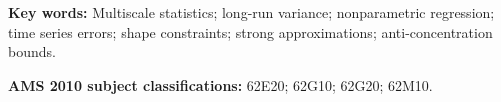 \documentclass[a4paper,12pt]{article}
\begin{document}
\renewcommand{\baselinestretch}{1.2}\normalsize

\textbf{Key words:} Multiscale statistics; long-run variance; nonparametric regression; time series errors; shape constraints; strong approximations; anti-concentration bounds.

\textbf{AMS 2010 subject classifications:} 62E20; 62G10; 62G20; 62M10. 

\allowdisplaybreaks[1]





%


{\small
\setlength{\bibsep}{0.55em}
}
\end{document}
